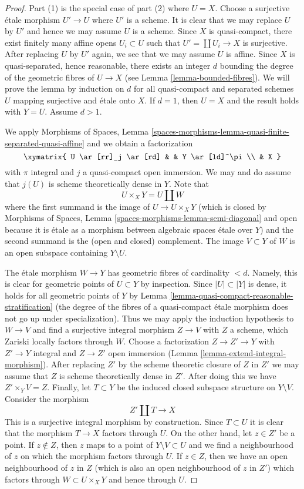 \begin{proof}
Part (1) is the special case of part (2) where $U = X$.
Choose a surjective \'etale morphism $U' \to U$
where $U'$ is a scheme. It is clear that we may replace $U$ by $U'$
and hence we may assume $U$ is a scheme. Since $X$ is quasi-compact,
there exist finitely many affine opens $U_i \subset U$ such that
$U' = \coprod U_i \to X$ is surjective.
After replacing $U$ by $U'$ again, we see that we may assume $U$ is affine.
Since $X$ is quasi-separated, hence reasonable, there exists an integer
$d$ bounding the degree of the geometric fibres of $U \to X$
(see Lemma \ref{lemma-bounded-fibres}).
We will prove the lemma by induction on $d$ for all quasi-compact
and separated schemes $U$ mapping surjective and \'etale onto $X$.
If $d = 1$, then $U = X$ and the result holds with $Y = U$.
Assume $d > 1$.

\medskip\noindent
We apply Morphisms of Spaces, Lemma
\ref{spaces-morphisms-lemma-quasi-finite-separated-quasi-affine}
and we obtain a factorization
$$
\xymatrix{
U \ar[rr]_j \ar[rd] & & Y \ar[ld]^\pi \\
& X
}
$$
with $\pi$ integral and $j$ a quasi-compact open immersion. We may and do
assume that $j(U)$ is scheme theoretically dense in $Y$. Note that
$$
U \times_X Y = U \amalg W
$$
where the first summand is the image of $U \to U \times_X Y$
(which is closed by
Morphisms of Spaces, Lemma \ref{spaces-morphisms-lemma-semi-diagonal}
and open because it is \'etale as a morphism between
algebraic spaces \'etale over $Y$) and
the second summand is the (open and closed) complement.
The image $V \subset Y$ of $W$ is an open subspace containing
$Y \setminus U$.

\medskip\noindent
The \'etale morphism $W \to Y$ has geometric fibres of cardinality $< d$.
Namely, this is clear for geometric points of $U \subset Y$ by inspection.
Since $|U| \subset |Y|$ is dense, it holds for all geometric points of $Y$
by Lemma \ref{lemma-quasi-compact-reasonable-stratification}
(the degree of the fibres of a quasi-compact \'etale morphism
does not go up under specialization). Thus we may apply the induction
hypothesis to $W \to V$ and find a surjective integral morphism
$Z \to V$ with $Z$ a scheme, which Zariski locally factors through $W$.
Choose a factorization $Z \to Z' \to Y$ with $Z' \to Y$ integral and
$Z \to Z'$ open immersion
(Lemma \ref{lemma-extend-integral-morphism}).
After replacing $Z'$ by the scheme theoretic closure of $Z$ in $Z'$
we may assume that $Z$ is scheme theoretically dense in $Z'$.
After doing this we have $Z' \times_Y V = Z$. Finally,
let $T \subset Y$ be the induced closed subspace structure on $Y \setminus V$.
Consider the morphism
$$
Z' \amalg T \longrightarrow X
$$
This is a surjective integral morphism by construction.
Since $T \subset U$ it is clear that the morphism $T \to X$
factors through $U$. On the other hand, let $z \in Z'$
be a point. If $z \not \in Z$, then $z$ maps to a point of
$Y \setminus V \subset U$ and we find a neighbourhood of $z$
on which the morphism factors through $U$.
If $z \in Z$, then we have an open neighbourhood of $z$ in $Z$
(which is also an open neighbourhood of $z$ in $Z'$)
which factors through $W \subset U \times_X Y$ and hence through $U$.
\end{proof}
